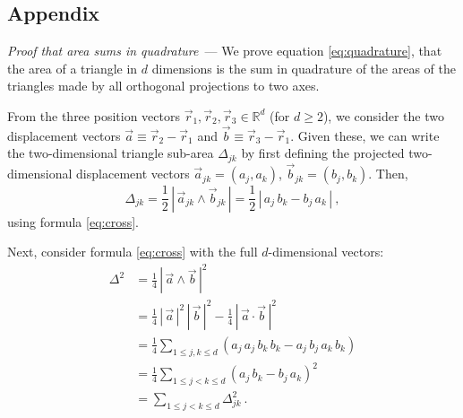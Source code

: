 \documentclass[10pt]{article}
\renewcommand{\paragraph}[1]{\par\addvspace{1.5ex}\noindent\textsl{#1}~---}
\newcommand{\secbreak}{\bigskip{\centering\footnotesize $\triangle~~~\triangle~~~\triangle$\par}\bigskip\noindent}
\newcommand{\abs}[1]{|\,{#1}\,|}
\begin{document}
\secbreak

\vspace{-\bigskipamount}
\renewcommand{\section}[2]{}%
{\small\singlespacing\par}

\secbreak
\appendix
\subsection{Appendix}
\label{sec:appendix}

\paragraph{Proof that area sums in quadrature} We prove equation \eqref{eq:quadrature}, that the area of a triangle in $d$ dimensions is the sum in quadrature of the areas of the triangles made by all orthogonal projections to two axes.

From the three position vectors $\vec{r}_1, \vec{r}_2, \vec{r}_3 \in \mathbb{R}^d$ (for $d \geq 2$), we consider the two displacement vectors $\vec{a} \equiv \vec{r}_2 - \vec{r}_1$ and $\vec{b} \equiv \vec{r}_3 - \vec{r}_1$.
Given these, we can write the two-dimensional triangle sub-area $\Delta_{jk}$ by first defining the projected two-dimensional displacement vectors $\vec{a}_{jk} = ( a_j, a_k )$, $\vec{b}_{jk} = ( b_j, b_k )$. Then,
\begin{equation}
    \Delta_{jk}
    = \frac{1}{2} \, \abs{ \vec{a}_{jk} \wedge \vec{b}_{jk} }
    = \frac{1}{2}
        \, \abs{a_j \, b_k - b_j \, a_k}~,
\end{equation}
using formula \eqref{eq:cross}.

Next, consider formula \eqref{eq:cross} with the full $d$-dimensional vectors:
\begin{align}
    \Delta^2
    &= \frac{1}{4}\, \abs{\vec{a} \wedge \vec{b}}^2 \nonumber\\
    &= \frac{1}{4}\, \abs{\vec{a}}^2 \, \abs{\vec{b}}^2 - \frac{1}{4}\, \abs{\vec{a} \cdot \vec{b}}^2 \nonumber\\
    &= \frac{1}{4} \sum_{1 \leq j, k \leq d}
        ( a_j \, a_j \, b_k \, b_k - a_j \, b_j \, a_k \, b_k ) \nonumber\\
    &= \frac{1}{4} \sum_{1 \leq j < k \leq d}
        ( a_j \, b_k - b_j \, a_k )^2 \nonumber\\
    &= \sum_{1 \leq j < k \leq d} \Delta_{jk}^2~.
\end{align}
\end{document}

